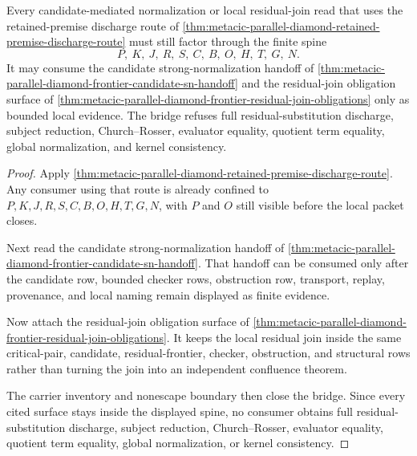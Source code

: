 \begin{theorem}
\label{thm:metacic-parallel-diamond-retained-premise-normalization-bridge}
Every candidate-mediated normalization or local residual-join read that uses the retained-premise discharge route of \autoref{thm:metacic-parallel-diamond-retained-premise-discharge-route} must still factor through the finite spine
$$
P,\ K,\ J,\ R,\ S,\ C,\ B,\ O,\ H,\ T,\ G,\ N .
$$
It may consume the candidate strong-normalization handoff of \autoref{thm:metacic-parallel-diamond-frontier-candidate-sn-handoff} and the residual-join obligation surface of \autoref{thm:metacic-parallel-diamond-frontier-residual-join-obligations} only as bounded local evidence. The bridge refuses full residual-substitution discharge, subject reduction, Church--Rosser, evaluator equality, quotient term equality, global normalization, and kernel consistency.
\end{theorem}
\begin{proof}
Apply \autoref{thm:metacic-parallel-diamond-retained-premise-discharge-route}. Any consumer using that route is already confined to $P,K,J,R,S,C,B,O,H,T,G,N$, with $P$ and $O$ still visible before the local packet closes.

Next read the candidate strong-normalization handoff of \autoref{thm:metacic-parallel-diamond-frontier-candidate-sn-handoff}. That handoff can be consumed only after the candidate row, bounded checker rows, obstruction row, transport, replay, provenance, and local naming remain displayed as finite evidence.

Now attach the residual-join obligation surface of \autoref{thm:metacic-parallel-diamond-frontier-residual-join-obligations}. It keeps the local residual join inside the same critical-pair, candidate, residual-frontier, checker, obstruction, and structural rows rather than turning the join into an independent confluence theorem.

The carrier inventory and nonescape boundary then close the bridge. Since every cited surface stays inside the displayed spine, no consumer obtains full residual-substitution discharge, subject reduction, Church--Rosser, evaluator equality, quotient term equality, global normalization, or kernel consistency.
\end{proof}
